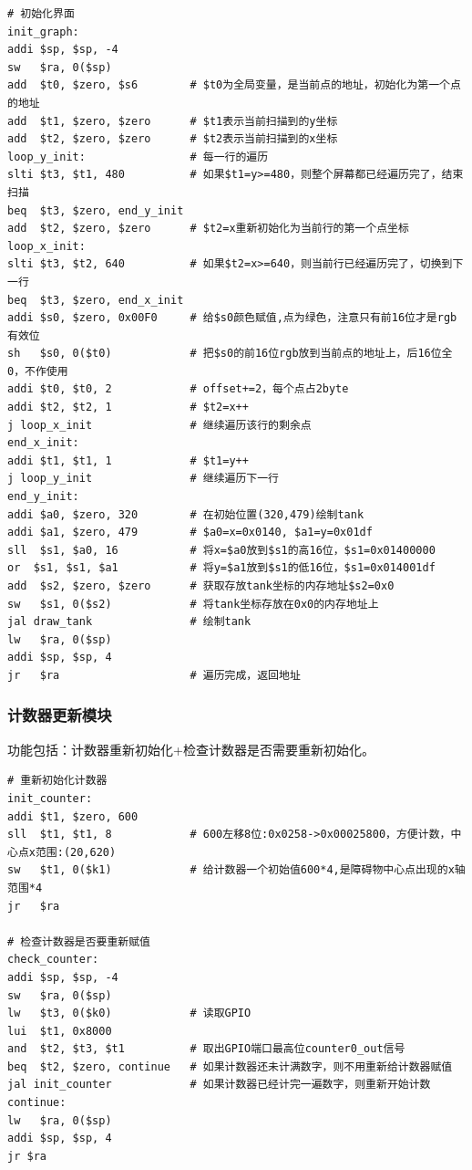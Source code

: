 \begin{lstlisting}[frame=shadowbox]
# 初始化界面
init_graph:
addi $sp, $sp, -4
sw   $ra, 0($sp)
add  $t0, $zero, $s6        # $t0为全局变量，是当前点的地址，初始化为第一个点的地址
add  $t1, $zero, $zero      # $t1表示当前扫描到的y坐标
add  $t2, $zero, $zero      # $t2表示当前扫描到的x坐标
loop_y_init:                # 每一行的遍历
slti $t3, $t1, 480          # 如果$t1=y>=480，则整个屏幕都已经遍历完了，结束扫描
beq  $t3, $zero, end_y_init        
add  $t2, $zero, $zero      # $t2=x重新初始化为当前行的第一个点坐标
loop_x_init:  
slti $t3, $t2, 640          # 如果$t2=x>=640，则当前行已经遍历完了，切换到下一行
beq  $t3, $zero, end_x_init
addi $s0, $zero, 0x00F0     # 给$s0颜色赋值,点为绿色，注意只有前16位才是rgb有效位
sh   $s0, 0($t0)            # 把$s0的前16位rgb放到当前点的地址上，后16位全0，不作使用
addi $t0, $t0, 2            # offset+=2，每个点占2byte
addi $t2, $t2, 1            # $t2=x++
j loop_x_init               # 继续遍历该行的剩余点
end_x_init:
addi $t1, $t1, 1            # $t1=y++
j loop_y_init               # 继续遍历下一行
end_y_init:
addi $a0, $zero, 320        # 在初始位置(320,479)绘制tank
addi $a1, $zero, 479        # $a0=x=0x0140, $a1=y=0x01df
sll  $s1, $a0, 16           # 将x=$a0放到$s1的高16位，$s1=0x01400000
or  $s1, $s1, $a1           # 将y=$a1放到$s1的低16位，$s1=0x014001df
add  $s2, $zero, $zero      # 获取存放tank坐标的内存地址$s2=0x0
sw   $s1, 0($s2)            # 将tank坐标存放在0x0的内存地址上
jal draw_tank               # 绘制tank
lw   $ra, 0($sp)
addi $sp, $sp, 4
jr   $ra                    # 遍历完成，返回地址
\end{lstlisting}

\subsubsection{计数器更新模块}
功能包括：计数器重新初始化+检查计数器是否需要重新初始化。
\begin{lstlisting}[frame=shadowbox]
# 重新初始化计数器
init_counter:
addi $t1, $zero, 600
sll  $t1, $t1, 8            # 600左移8位:0x0258->0x00025800，方便计数，中心点x范围:(20,620)
sw   $t1, 0($k1)            # 给计数器一个初始值600*4,是障碍物中心点出现的x轴范围*4
jr   $ra

# 检查计数器是否要重新赋值
check_counter:
addi $sp, $sp, -4
sw   $ra, 0($sp)
lw   $t3, 0($k0)            # 读取GPIO
lui  $t1, 0x8000     
and  $t2, $t3, $t1          # 取出GPIO端口最高位counter0_out信号
beq  $t2, $zero, continue   # 如果计数器还未计满数字，则不用重新给计数器赋值
jal init_counter            # 如果计数器已经计完一遍数字，则重新开始计数
continue:
lw   $ra, 0($sp)
addi $sp, $sp, 4
jr $ra
\end{lstlisting}

